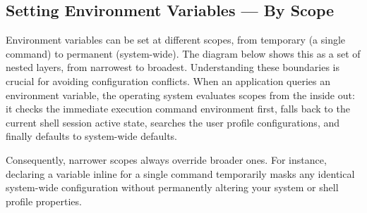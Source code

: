 \documentclass{article}
\begin{document}
\subsection{Setting Environment Variables --- By Scope}

Environment variables can be set at different scopes, from temporary
(a single command) to permanent (system-wide). The diagram below shows this as
a set of nested layers, from narrowest to broadest. Understanding these boundaries is crucial for avoiding configuration conflicts. When an application queries an environment variable, the operating system evaluates scopes from the inside out: it checks the immediate execution command environment first, falls back to the current shell session active state, searches the user profile configurations, and finally defaults to system-wide defaults. 

Consequently, narrower scopes always override broader ones. For instance, declaring a variable inline for a single command temporarily masks any identical system-wide configuration without permanently altering your system or shell profile properties.
\end{document}
